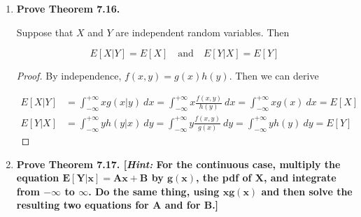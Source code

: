 \documentclass[10pt, oneside]{article}
\begin{document}
\begin{enumerate}[label=7.\arabic*]
  Then we calculate
  
  \begin{align*}
  E[X | y] &= \int^{+\infty}_{-\infty} x g(x | y) \ dx = \int^y_0 \frac{x}{y} \ dx = \boxed{y/2} \\
  E[Y | x] &= \int^{+\infty}_{-\infty} y h(y | x) \ dy = \int^{+\infty}_x ye^{x-y} \ dy = \boxed{x + 1}
  \end{align*}
  
  Lastly, verifying that the Law of Total Expectation holds:
  
  \begin{align*}
  E[E[X | Y]] &= \int^{+\infty}_0 \frac{y}{2} (ye^{-y}) \ dy = \boxed{1} \\
  E[E[Y | X]] &= \int^{+\infty}_0 (x+1) e^{-x} \ dx = \boxed{2}
  \end{align*}
  
  Therefore, $E[X] = E[E[X | Y]]$ and $E[Y] = E[E[Y | X]]$.

\item  \begin{tcolorbox}[
  colback=Cerulean!5!white,
  colframe=Cerulean!75!black]
  \textbf{Prove Theorem 7.16.}
  \end{tcolorbox}
  
  \begin{thm*}
  Suppose that $X$ and $Y$ are independent random variables. Then
  
  \[ E[X | Y] = E[X] \quad \text{and} \quad E[Y | X] = E[Y] \]
  \end{thm*}
  
  \begin{proof}
  By independence, $f(x,y) = g(x) h(y)$. Then we can derive
  
  \begin{align*}
  E[X | Y] &= \int^{+\infty}_{-\infty} x g(x | y) \ dx = \int^{+\infty}_{-\infty} x \frac{f(x,y)}{h(y)} \ dx = \int^{+\infty}_{-\infty} x g(x) \ dx = E[X] \\
  E[Y | X] &= \int^{+\infty}_{-\infty} y h(y | x) \ dy = \int^{+\infty}_{-\infty} y \frac{f(x,y)}{g(x)} \ dy = \int^{+\infty}_{-\infty} y h(y) \ dy = E[Y]
  \end{align*}
  \end{proof}
  
\item  \begin{tcolorbox}[
  colback=Cerulean!5!white,
  colframe=Cerulean!75!black]
  \textbf{Prove Theorem 7.17. [\textit{Hint:} For the continuous case, multiply the equation $\bm{E[Y | x] = Ax + B}$ by $\bm{g(x)}$, the pdf of $\bm{X}$, and integrate from $\bm{-\infty}$ to $\bm{\infty}$. Do the same thing, using $\bm{xg(x)}$ and then solve the resulting two equations for $\bm{A}$ and for $\bm{B}$.]}
  \end{tcolorbox}
  

\end{enumerate}
\end{document}
